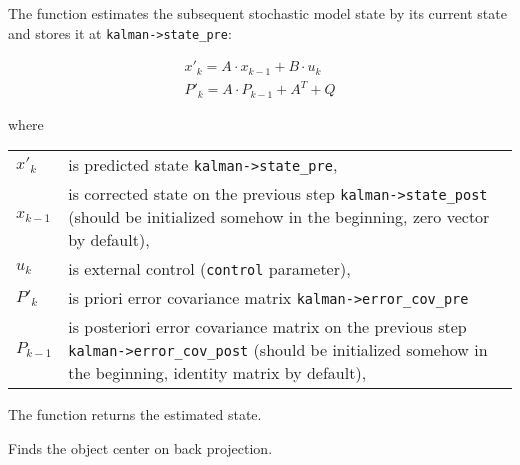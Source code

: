 \begin{description}
\ifC
{}
\else
{}
\fi
{}
\end{description}

The function estimates the subsequent stochastic model state by its current state and stores it at \texttt{kalman->state\_pre}:

\[
\begin{array}{l}
x'_k=A \cdot x_{k-1}+B \cdot u_k\\
P'_k=A \cdot P_{k-1}+A^T + Q
\end{array}
\]

where

\begin{tabular}{l p{5 in}}
$x'_k$ & is predicted state \texttt{kalman->state\_pre},\\
$x_{k-1}$ & is corrected state on the previous step \texttt{kalman->state\_post}
                (should be initialized somehow in the beginning, zero vector by default),\\
$u_k$ & is external control (\texttt{control} parameter),\\
$P'_k$ & is priori error covariance matrix \texttt{kalman->error\_cov\_pre}\\
$P_{k-1}$ & is posteriori error covariance matrix on the previous step \texttt{kalman->error\_cov\_post}
                (should be initialized somehow in the beginning, identity matrix by default),
\end{tabular}

The function returns the estimated state.

Finds the object center on back projection.


\begin{description}
\end{description}

